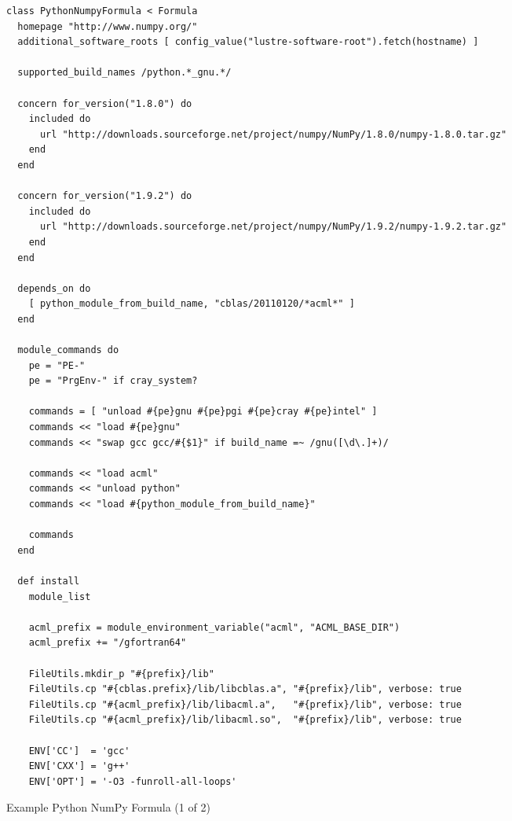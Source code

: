 \documentclass{acm_proc_article-sp}
\begin{document}
\begin{figure*} %
\begin{verbatim}
class PythonNumpyFormula < Formula
  homepage "http://www.numpy.org/"
  additional_software_roots [ config_value("lustre-software-root").fetch(hostname) ]

  supported_build_names /python.*_gnu.*/

  concern for_version("1.8.0") do
    included do
      url "http://downloads.sourceforge.net/project/numpy/NumPy/1.8.0/numpy-1.8.0.tar.gz"
    end
  end

  concern for_version("1.9.2") do
    included do
      url "http://downloads.sourceforge.net/project/numpy/NumPy/1.9.2/numpy-1.9.2.tar.gz"
    end
  end

  depends_on do
    [ python_module_from_build_name, "cblas/20110120/*acml*" ]
  end

  module_commands do
    pe = "PE-"
    pe = "PrgEnv-" if cray_system?

    commands = [ "unload #{pe}gnu #{pe}pgi #{pe}cray #{pe}intel" ]
    commands << "load #{pe}gnu"
    commands << "swap gcc gcc/#{$1}" if build_name =~ /gnu([\d\.]+)/

    commands << "load acml"
    commands << "unload python"
    commands << "load #{python_module_from_build_name}"

    commands
  end

  def install
    module_list

    acml_prefix = module_environment_variable("acml", "ACML_BASE_DIR")
    acml_prefix += "/gfortran64"

    FileUtils.mkdir_p "#{prefix}/lib"
    FileUtils.cp "#{cblas.prefix}/lib/libcblas.a", "#{prefix}/lib", verbose: true
    FileUtils.cp "#{acml_prefix}/lib/libacml.a",   "#{prefix}/lib", verbose: true
    FileUtils.cp "#{acml_prefix}/lib/libacml.so",  "#{prefix}/lib", verbose: true

    ENV['CC']  = 'gcc'
    ENV['CXX'] = 'g++'
    ENV['OPT'] = '-O3 -funroll-all-loops'
\end{verbatim}
\label{fig:PythonNumpyFormula1}
\caption{Example Python NumPy Formula (1 of 2)}
\end{figure*}
\end{document}

